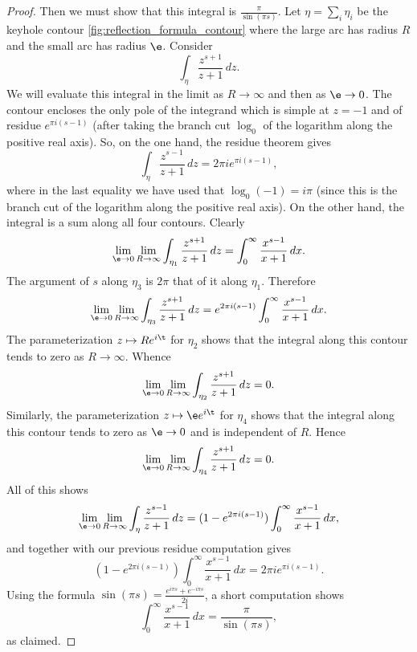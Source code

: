 \documentclass[12pt]{article}
\begin{document}
\begin{proof}
        \noindent Then we must show that this integral is \(\frac{\pi}{\sin(\pi s)}\). Let \(\eta = \sum_{i}\eta_{i}\) be the keyhole contour \cref{fig:reflection_formula_contour} where the large arc has radius \(R\) and the small arc has radius \(\e\). Consider
        \[
          \int_{\eta}\frac{z^{s+1}}{z+1}\,dz.
        \]
        We will evaluate this integral in the limit as \(R \to \infty\) and then as \(\e \to 0\). The contour encloses the only pole of the integrand which is simple at \(z = -1\) and of residue \(e^{\pi i(s-1)}\) (after taking the branch cut \(\log_{0}\) of the logarithm along the positive real axis). So, on the one hand, the residue theorem gives
        \[
          \int_{\eta}\frac{z^{s-1}}{z+1}\,dz = 2\pi ie^{\pi i(s-1)},
        \]
        where in the last equality we have used that \(\log_{0}(-1) = i\pi\) (since this is the branch cut of the logarithm along the positive real axis). On the other hand, the integral is a sum along all four contours. Clearly
        \[
          \lim_{\e \to 0}\lim_{R \to \infty}\int_{\eta_{1}}\frac{z^{s+1}}{z+1}\,dz = \int_{0}^{\infty}\frac{x^{s-1}}{x+1}\,dx.
        \]
        The argument of \(s\) along \(\eta_{3}\) is \(2\pi\) that of it along \(\eta_{1}\). Therefore
        \[
          \lim_{\e \to 0}\lim_{R \to \infty}\int_{\eta_{3}}\frac{z^{s+1}}{z+1}\,dz = e^{2\pi i(s-1)}\int_{0}^{\infty}\frac{x^{s-1}}{x+1}\,dx.
        \]
        The parameterization \(z \mapsto Re^{i\t}\) for \(\eta_{2}\) shows that the integral along this contour tends to zero as \(R \to \infty\). Whence
        \[
          \lim_{\e \to 0}\lim_{R \to \infty}\int_{\eta_{2}}\frac{z^{s+1}}{z+1}\,dz = 0.
        \]
        Similarly, the parameterization \(z \mapsto \e e^{i\t}\) for \(\eta_{4}\) shows that the integral along this contour tends to zero as \(\e \to 0\) and is independent of \(R\). Hence 
        \[
          \lim_{\e \to 0}\lim_{R \to \infty}\int_{\eta_{4}}\frac{z^{s+1}}{z+1}\,dz = 0.
        \]
        All of this shows
        \[
          \lim_{\e \to 0}\lim_{R \to \infty} \int_{\eta}\frac{z^{s-1}}{z+1}\,dz = (1-e^{2\pi i(s-1)})\int_{0}^{\infty}\frac{x^{s-1}}{x+1}\,dx,
        \]
        and together with our previous residue computation gives
        \[
          (1-e^{2\pi i(s-1)})\int_{0}^{\infty}\frac{x^{s-1}}{x+1}\,dx = 2\pi ie^{\pi i(s-1)}.
        \]
        Using the formula \(\sin(\pi s) = \frac{e^{i\pi s}+e^{-i\pi s}}{2i}\), a short computation shows
        \[
          \int_{0}^{\infty}\frac{x^{s-1}}{x+1}\,dx = \frac{\pi}{\sin(\pi s)},
        \]
        as claimed.
      \end{proof}
\end{document}
